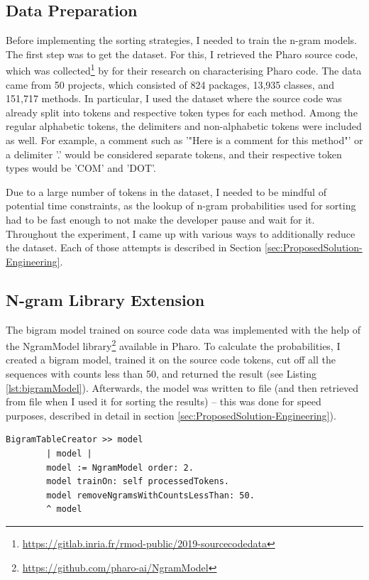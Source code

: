 \subsection{Data Preparation}
Before implementing the sorting strategies, I needed to train the n-gram models. The first step was to get the dataset. For this, I retrieved the Pharo source code, which was collected\footnote{\url{https://gitlab.inria.fr/rmod-public/2019-sourcecodedata}} by \cite{Zait20a} for their research on characterising Pharo code. The data came from 50 projects, which consisted of 824 packages, 13,935 classes, and 151,717 methods. In particular, I used the dataset where the source code was already split into tokens and respective token types for each method. Among the regular alphabetic tokens, the delimiters and non-alphabetic tokens were included as well. For example, a comment such as '"Here is a comment for this method"' or a delimiter '.' would be considered separate tokens, and their respective token types would be 'COM' and 'DOT'.

Due to a large number of tokens in the dataset, I needed to be mindful of potential time constraints, as the lookup of n-gram probabilities used for sorting had to be fast enough to not make the developer pause and wait for it. Throughout the experiment, I came up with various ways to additionally reduce the dataset. Each of those attempts is described in Section \ref{sec:ProposedSolution-Engineering}.

\subsection{N-gram Library Extension}
The bigram model trained on source code data was implemented with the help of the NgramModel library\footnote{\url{https://github.com/pharo-ai/NgramModel}} available in Pharo. To calculate the probabilities, I created a bigram model, trained it on the source code tokens, cut off all the sequences with counts less than 50, and returned the result (see Listing \ref{lst:bigramModel}). Afterwards, the model was written to file (and then retrieved from file when I used it for sorting the results) -- this was done for speed purposes, described in detail in section \ref{sec:ProposedSolution-Engineering}).

\begin{lstlisting}[label={lst:bigramModel}, caption={Here is how the bigram model for sorting is created and trained}]
    BigramTableCreator >> model
        | model |
        model := NgramModel order: 2.
        model trainOn: self processedTokens.
        model removeNgramsWithCountsLessThan: 50.
        ^ model
\end{lstlisting}

